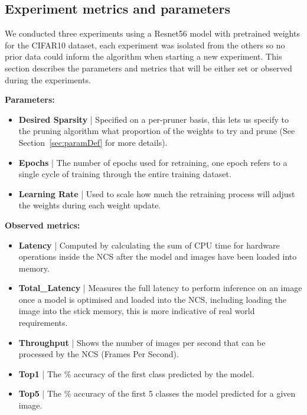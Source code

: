 \documentclass[../Dissertation.tex]{subfiles}
\begin{document}
\subsection{Experiment metrics and parameters}\label{sec:metricsandparams}


We conducted three experiments using a Resnet56 model with pretrained weights for the CIFAR10 dataset, each experiment was isolated from the others so no prior data could inform the algorithm when starting a new experiment.
This section describes the parameters and metrics that will be either set or observed during the experiments.

\singlespacing
\noindent\textbf{Parameters:}
\begin{itemize}
    \item \textbf{Desired Sparsity} | Specified on a per-pruner basis, this lets us specify to the pruning algorithm what proportion of the weights to try and prune (See Section~\ref{sec:paramDef} for more details).
    \item \textbf{Epochs} | The number of epochs used for retraining, one epoch refers to a single cycle of training through the entire training dataset.
    \item \textbf{Learning Rate} | Used to scale how much the retraining process will adjust the weights during each weight update.
\end{itemize}
\doublespacing

\singlespacing
\noindent\textbf{Observed metrics:}
\begin{itemize}
    \item \textbf{Latency} | Computed by calculating the sum of CPU time for hardware operations inside the NCS after the model and images have been loaded into memory.
    \item \textbf{Total\_Latency} | Measures the full latency to perform inference on an image once a model is optimised and loaded into the NCS, including loading the image into the stick memory, this is more indicative of real world requirements.
    \item \textbf{Throughput} | Shows the number of images per second that can be processed by the NCS (Frames Per Second).
    \item \textbf{Top1} | The \% accuracy of the first class predicted by the model.
    \item \textbf{Top5} | The \% accuracy of the first 5 classes the model predicted for a given image.
\end{itemize}
\doublespacing
\end{document}
